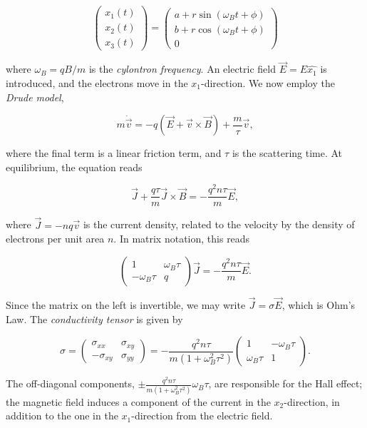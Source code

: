 \documentclass[12pt, letterpaper]{article}
\begin{document}
\[\begin{pmatrix} x_1(t)\\x_2(t)\\x_3(t) \end{pmatrix} = \begin{pmatrix} a + r\sin(\omega_Bt+\phi) \\ b + r\cos(\omega_Bt+\phi) \\ 0 \end{pmatrix}\]

where $\omega_B = qB/m$ is the \emph{cylontron frequency}. An electric field $\vec{E}=E\hat{x_1}$ is introduced, and the electrons move in the $x_1$-direction. We now employ the \emph{Drude model},

\[m\dot{\vec{v}} = -q(\vec{E}+\vec{v}\times\vec{B}) + \frac{m}{\tau}\vec{v},\]

where the final term is a linear friction term, and $\tau$ is the scattering time. At equilibrium, the equation reads

\[\vec{J} + \frac{q\tau}{m}\vec{J}\times\vec{B} = -\frac{q^2n\tau}{m}\vec{E},\]

where $\vec{J} = -nq\vec{v}$ is the current density, related to the velocity by the density of electrons per unit area $n$. In matrix notation, this reads

\[\begin{pmatrix} 1 & \omega_B\tau \\ -\omega_B\tau & q \end{pmatrix}\vec{J} = -\frac{q^2n\tau}{m}\vec{E}.\]

Since the matrix on the left is invertible, we may write $\vec{J} = \sigma \vec{E}$, which is Ohm's Law. The \emph{conductivity tensor} is given by

\[\sigma = \begin{pmatrix} \sigma_{xx} & \sigma_{xy} \\ -\sigma_{xy} & \sigma_{yy} \end{pmatrix} = -\frac{q^2n\tau}{m(1+\omega_B^2\tau^2)}\begin{pmatrix} 1 & -\omega_B\tau \\  \omega_B\tau& 1 \end{pmatrix}.\]

The off-diagonal components, $\pm\frac{q^2n\tau}{m(1+\omega_B^2\tau^2)}\omega_B\tau$, are responsible for the Hall effect; the magnetic field induces a component of the current in the $x_2$-direction, in addition to the one in the $x_1$-direction from the electric field. 
\end{document}
